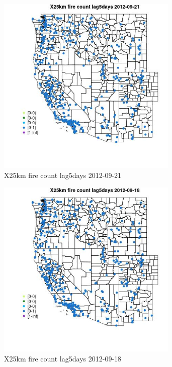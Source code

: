 \begin{figure} 
\centering  
\includegraphics[width=0.77\textwidth]{Code_Outputs/Report_ML_input_PM25_Step4_part_e_de_duplicated_aves_compiled_2019-05-14wNAs_MapObsX25km_fire_count_lag5days2012-09-21.jpg} 
\caption{\label{fig:Report_ML_input_PM25_Step4_part_e_de_duplicated_aves_compiled_2019-05-14wNAsMapObsX25km_fire_count_lag5days2012-09-21}X25km fire count lag5days 2012-09-21} 
\end{figure} 
 

\begin{figure} 
\centering  
\includegraphics[width=0.77\textwidth]{Code_Outputs/Report_ML_input_PM25_Step4_part_e_de_duplicated_aves_compiled_2019-05-14wNAs_MapObsX25km_fire_count_lag5days2012-09-18.jpg} 
\caption{\label{fig:Report_ML_input_PM25_Step4_part_e_de_duplicated_aves_compiled_2019-05-14wNAsMapObsX25km_fire_count_lag5days2012-09-18}X25km fire count lag5days 2012-09-18} 
\end{figure} 
 

